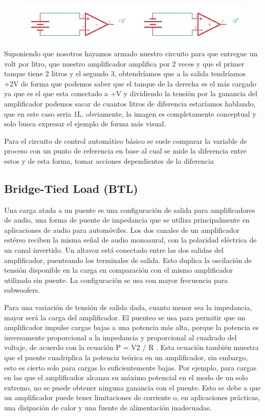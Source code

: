 \documentclass[../main.tex]{subfiles}
\begin{document}
	\begin{figure}[H]
		\centering
		\includegraphics[width= \textwidth]{imagen21}
	\end{figure}
	Suponiendo que nosotros hayamos armado nuestro circuito para que entregue un 
	volt por litro, que nuestro amplificador amplifica por 2 veces y que el primer 
	tanque tiene 2 litros y el segundo 3, obtendríamos que a la salida tendríamos 
	+2V de forma que podemos saber que el tanque de la derecha es el más cargado ya 
	que es el que esta conectado a +V y dividiendo la tensión por la ganancia del 
	amplificador podemos sacar de cuantos litros de diferencia estaríamos hablando, 
	que en este caso seria 1L. obviamente, la imagen es completamente conceptual y 
	solo busca expresar el ejemplo de forma más visual.

	Para el circuito de control automático básico se suele comparar la variable de 
	proceso con un punto de referencia en base al cual se mide la diferencia entre 
	estos y de esta forma, tomar acciones dependientes de la diferencia

	\subsection{Bridge-Tied Load (BTL)}
	Una carga atada a un puente es una configuración de salida para amplificadores de 
	audio, una forma de puente de impedancia que se utiliza principalmente en 
	aplicaciones de audio para automóviles. Los dos canales de un amplificador estéreo 
	reciben la misma señal de audio monoaural, con la polaridad eléctrica de un canal 
	invertido. Un altavoz está conectado entre las dos salidas del amplificador, 
	puenteando los terminales de salida. Esto duplica la oscilación de tensión 
	disponible en la carga en comparación con el mismo amplificador utilizado sin 
	puente. La configuración se usa con mayor frecuencia para subwoofers.

	Para una variación de tensión de salida dada, cuanto menor sea la impedancia, 
	mayor será la carga del amplificador. El puenteo se usa para permitir que un 
	amplificador impulse cargas bajas a una potencia más alta, porque la potencia es 
	inversamente proporcional a la impedancia y proporcional al cuadrado del voltaje, 
	de acuerdo con la ecuación P = V2 / R . Esta ecuación también muestra que el 
	puente cuadriplica la potencia teórica en un amplificador, sin embargo, esto es 
	cierto solo para cargas lo suficientemente bajas. Por ejemplo, para cargas en las 
	que el amplificador alcanza su máximo potencial en el modo de un solo extremo, no 
	se puede obtener ninguna ganancia con el puente. Esto se debe a que un 
	amplificador puede tener limitaciones de corriente o, en aplicaciones prácticas, 
	una disipación de calor y una fuente de alimentación inadecuadas.
\end{document}
